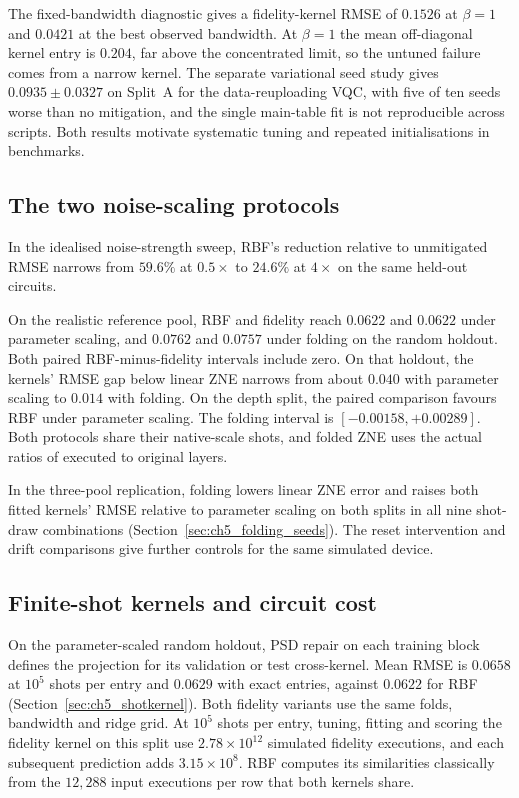 \documentclass[Thesis.tex]{subfiles}
\begin{document}
The fixed-bandwidth diagnostic gives a fidelity-kernel RMSE of
$0.1526$ at $\beta=1$ and $0.0421$ at the best observed
bandwidth. At $\beta=1$ the mean off-diagonal kernel entry is $0.204$, far above
the concentrated limit, so the untuned failure comes from a narrow kernel. The separate
variational seed study gives $0.0935 \pm 0.0327$ on Split~A for the data-reuploading
VQC, with five of ten seeds worse than no mitigation, and the single main-table fit is
not reproducible across scripts. Both results motivate systematic tuning and repeated
initialisations in benchmarks.

\subsection{The two noise-scaling protocols}

In the idealised noise-strength sweep, RBF's reduction relative to
unmitigated RMSE narrows from $59.6\%$ at $0.5\times$ to $24.6\%$ at $4\times$
on the same held-out circuits.

On the realistic reference pool, RBF and fidelity reach $0.0622$ and
$0.0622$ under parameter scaling, and $0.0762$ and
$0.0757$ under folding on the random holdout. Both paired
RBF-minus-fidelity intervals include zero.
On that holdout, the kernels' RMSE gap below linear ZNE
narrows from about $0.040$ with parameter scaling to $0.014$ with folding.
On the depth split, the paired comparison favours RBF under parameter
scaling. The folding interval is
$[-0.00158,\allowbreak +0.00289]$.
Both protocols share their native-scale shots, and folded ZNE uses the
actual ratios of executed to original layers.

In the three-pool replication, folding lowers linear ZNE error and raises
both fitted kernels' RMSE relative to parameter scaling on both splits in
all nine shot-draw combinations (Section~\ref{sec:ch5_folding_seeds}).
The reset intervention and drift comparisons give further controls for the
same simulated device.

\subsection{Finite-shot kernels and circuit cost}

On the parameter-scaled random holdout, PSD repair on each training block defines
the projection for its validation or test cross-kernel. Mean RMSE is $0.0658$
at $10^5$ shots per entry and $0.0629$ with exact entries, against $0.0622$ for
RBF (Section~\ref{sec:ch5_shotkernel}). Both fidelity variants use the same
folds, bandwidth and ridge grid. At $10^5$ shots per entry, tuning, fitting and
scoring the fidelity kernel on this split use $2.78\times10^{12}$ simulated
fidelity executions, and each subsequent prediction adds $3.15\times10^{8}$.
RBF computes its similarities classically from the $12{,}288$ input executions
per row that both kernels share.
\end{document}
